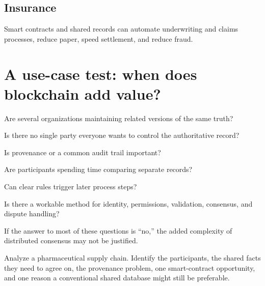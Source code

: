 \subsection{Insurance}

Smart contracts and shared records can automate underwriting and claims processes, reduce paper, speed settlement, and reduce fraud.

\section{A use-case test: when does blockchain add value?}

\begin{utpsteps}
  \item {} Are several organizations maintaining related versions of the same truth?
  \item {} Is there no single party everyone wants to control the authoritative record?
  \item {} Is provenance or a common audit trail important?
  \item {} Are participants spending time comparing separate records?
  \item {} Can clear rules trigger later process steps?
  \item {} Is there a workable method for identity, permissions, validation, consensus, and dispute handling?
\end{utpsteps}

If the answer to most of these questions is ``no,'' the added complexity of distributed consensus may not be justified.

\begin{tryit}
Analyze a pharmaceutical supply chain. Identify the participants, the shared facts they need to agree on, the provenance problem, one smart-contract opportunity, and one reason a conventional shared database might still be preferable.
\end{tryit}

